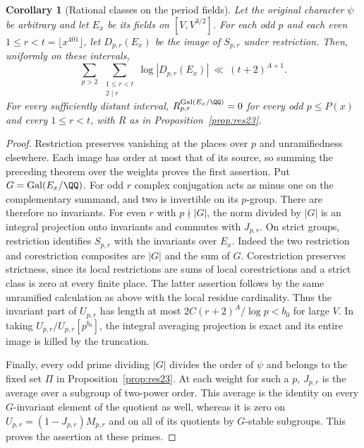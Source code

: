 \documentclass[a4paper,11pt]{article}
\newtheorem{corollary}[proposition]{Corollary}
\theoremstyle{definition}
\theoremstyle{remark}
\numberwithin{equation}{section}
\begin{document}
\begin{corollary}[Rational classes on the period fields]
\leavevmode\label{cor:rationalperiod538}
Let the original character \(\psi\) be arbitrary and let
\(E_x\) be its fields on \([V,V^{3/2}]\). For each odd \(p\)
and each even \(1\le r<t=\lfloor x^{401}\rfloor\), let
\(D_{p,r}(E_x)\) be the image of \(S_{p,r}\) under restriction.
Then, uniformly on these intervals,
\[
 \sum_{p>2}\ \sum_{\substack{1\le r<t\\2\mid r}}
      \log |D_{p,r}(E_x)|\ \ll\ (t+2)^{A+1}.
\]
For every sufficiently distant interval,
\(R_{p,r}^{\operatorname{Gal}(E_x/\QQ)}=0\) for every odd
\(p\le P(x)\) and every \(1\le r<t\), with \(R\) as in
Proposition~\ref{prop:res23}.
\end{corollary}
\begin{proof}
Restriction preserves vanishing at the places over \(p\) and
unramifiedness elsewhere. Each image has order at most that
of its source, so summing the preceding theorem over the weights
proves the first assertion. Put \(G=\operatorname{Gal}(E_x/\QQ)\).
For odd \(r\) complex conjugation acts as minus one on the
complementary summand, and two is invertible on its \(p\)-group.
There are therefore no invariants. For even \(r\) with
\(p\nmid|G|\), the norm divided by \(|G|\) is an integral
projection onto invariants and commutes with \(J_{p,r}\).
On strict groups, restriction identifies \(S_{p,r}\) with
the invariants over \(E_x\). Indeed the two restriction and
corestriction composites are \(|G|\) and the sum of \(G\).
Corestriction preserves strictness, since its local restrictions
are sums of local corestrictions and a strict class is zero at
every finite place. The latter assertion follows by the same
unramified calculation as above with the local residue cardinality.
Thus the invariant part of \(U_{p,r}\) has length at most
\(2C(r+2)^A/\log p<b_0\) for large \(V\). In taking
\(U_{p,r}/U_{p,r}[p^{b_0}]\), the integral averaging projection
is exact and its entire image is killed by the truncation.

Finally, every odd prime dividing \(|G|\) divides the order of
\(\psi\) and belongs to the fixed set \(\Pi\) in
Proposition~\ref{prop:res23}. At each weight for such a \(p\),
\(J_{p,r}\) is the average over a subgroup of two-power order.
This average is the identity on every \(G\)-invariant element
of the quotient as well, whereas it is zero on
\(U_{p,r}=(1-J_{p,r})M_{p,r}\) and on all of its quotients
by \(G\)-stable subgroups. This proves the assertion at these
primes.
\end{proof}
\end{document}
